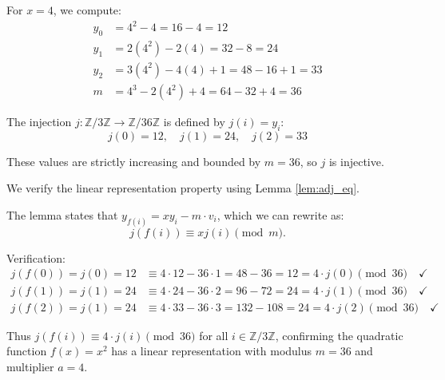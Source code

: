\begin{example}
For $x = 4$, we compute:
\begin{align*}
y_0 &= 4^2 - 4 = 16 - 4 = 12 \\
y_1 &= 2(4^2) - 2(4) = 32 - 8 = 24 \\
y_2 &= 3(4^2) - 4(4) + 1 = 48 - 16 + 1 = 33 \\
m &= 4^3 - 2(4^2) + 4 = 64 - 32 + 4 = 36
\end{align*}

The injection $j: \mathbb{Z}/3\mathbb{Z} \to \mathbb{Z}/36\mathbb{Z}$ is defined by $j(i) = y_i$:
$$j(0) = 12, \quad j(1) = 24, \quad j(2) = 33$$

These values are strictly increasing and bounded by $m = 36$, so $j$ is injective.

We verify the linear representation property using Lemma \ref{lem:adj_eq}. 

The lemma states that $y_{f(i)} = x y_i - m \cdot v_i$, which we can rewrite as:
$$j(f(i)) \equiv x j(i) \pmod{m}.$$

Verification:
\begin{align*}
j(f(0)) = j(0) = 12 &\equiv 4 \cdot 12 - 36 \cdot 1 = 48 - 36 = 12 = 4 \cdot j(0) \pmod{36} \quad\checkmark \\
j(f(1)) = j(1) = 24 &\equiv 4 \cdot 24 - 36 \cdot 2 = 96 - 72 = 24 = 4 \cdot j(1) \pmod{36} \quad\checkmark \\
j(f(2)) = j(1) = 24 &\equiv 4 \cdot 33 - 36 \cdot 3 = 132 - 108 = 24 = 4 \cdot j(2) \pmod{36} \quad\checkmark
\end{align*}

Thus $j(f(i)) \equiv 4 \cdot j(i) \pmod{36}$ for all $i \in \mathbb{Z}/3\mathbb{Z}$, confirming the quadratic function $f(x) = x^2$ has a linear representation with modulus $m = 36$ and multiplier $a = 4$.
\end{example}
